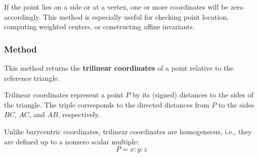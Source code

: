 \medskip
\noindent
If the point lies on a side or at a vertex, one or more coordinates will be zero accordingly. This method is especially useful for checking point location, computing weighted centers, or constructing affine invariants.

\vspace{1em}
\begin{minipage}{.45\textwidth}
  \let\tul\tkzUseLua
\end{minipage}
\begin{minipage}{.55\textwidth}
\begin{tkzexample}
\end{tkzexample}
\end{minipage}

\subsubsection{Method }
\label{ssub:triangle_trilinear_coordinates_pt}

This method returns the \textbf{trilinear coordinates} of a point relative to the reference triangle.

\medskip
\noindent
Trilinear coordinates represent a point $P$ by its (signed) distances to the sides of the triangle. The triple  corresponds to the directed distances from $P$ to the sides $BC$, $AC$, and $AB$, respectively.

\begin{mybox}
\end{mybox}

\medskip
\noindent
Unlike barycentric coordinates, trilinear coordinates are homogeneous, i.e., they are defined up to a nonzero scalar multiple:
\[
P = x : y : z
\]

